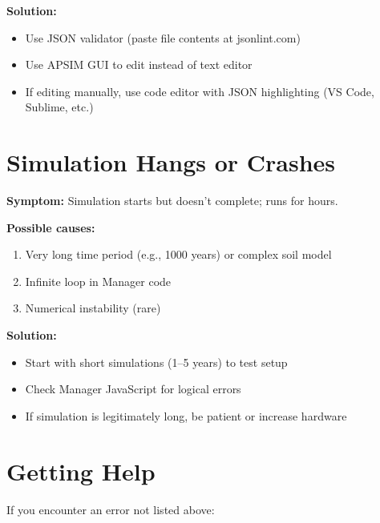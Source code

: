 \textbf{Solution:}
\begin{itemize}
  \item Use JSON validator (paste file contents at jsonlint.com)
  \item Use APSIM GUI to edit instead of text editor
  \item If editing manually, use code editor with JSON highlighting (VS Code, Sublime, etc.)
\end{itemize}

\section{Simulation Hangs or Crashes}

\begin{warningbox}
\textbf{Symptom:} Simulation starts but doesn't complete; runs for hours.
\end{warningbox}

\textbf{Possible causes:}
\begin{enumerate}
  \item Very long time period (e.g., 1000 years) or complex soil model
  \item Infinite loop in Manager code
  \item Numerical instability (rare)
\end{enumerate}

\textbf{Solution:}
\begin{itemize}
  \item Start with short simulations (1--5 years) to test setup
  \item Check Manager JavaScript for logical errors
  \item If simulation is legitimately long, be patient or increase hardware
\end{itemize}

\section{Getting Help}

If you encounter an error not listed above:

